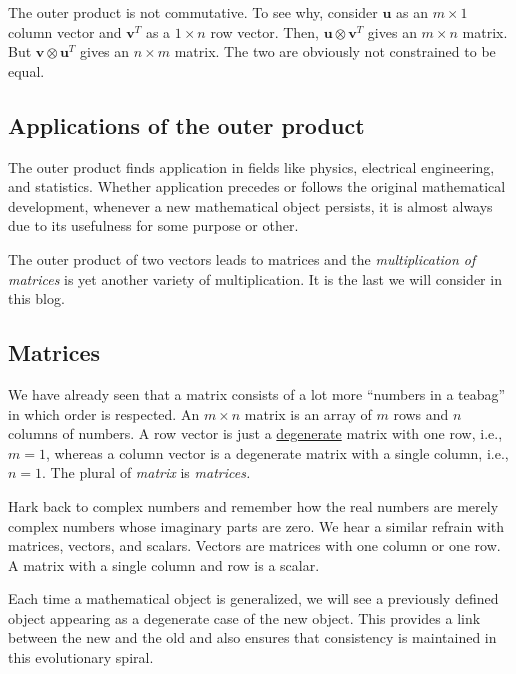 \documentclass[
  a4paper,
]{article}
\begin{document}
The outer product is not commutative. To see why, consider
\(\mathbf{u}\) as an \(m \times 1\) column vector and \(\mathbf{v}^{T}\)
as a \(1 \times n\) row vector. Then,
\(\mathbf{u} \otimes \mathbf{v}^{T}\) gives an \(m \times n\) matrix.
But \(\mathbf{v} \otimes \mathbf{u}^{T}\) gives an \(n \times m\)
matrix. The two are obviously not constrained to be equal.

\hypertarget{applications-of-the-outer-product}{%
\subsection{Applications of the outer
product}\label{applications-of-the-outer-product}}

The outer product finds application in fields like physics, electrical
engineering, and statistics. Whether application precedes or follows the
original mathematical development, whenever a new mathematical object
persists, it is almost always due to its usefulness for some purpose or
other.

The outer product of two vectors leads to matrices and the
\emph{multiplication of matrices} is yet another variety of
multiplication. It is the last we will consider in this blog.

\hypertarget{matrices}{%
\subsection{Matrices}\label{matrices}}

We have already seen that a matrix consists of a lot more ``numbers in a
teabag'' in which order is respected. An \(m \times n\) matrix is an
array of \(m\) rows and \(n\) columns of numbers. A row vector is just a
\href{https://en.wikipedia.org/wiki/Degenerate_\%28mathematics\%29}{degenerate}
matrix with one row, i.e., \(m = 1\), whereas a column vector is a
degenerate matrix with a single column, i.e., \(n = 1\). The plural of
\emph{matrix} is \emph{matrices.}

Hark back to complex numbers and remember how the real numbers are
merely complex numbers whose imaginary parts are zero. We hear a similar
refrain with matrices, vectors, and scalars. Vectors are matrices with
one column or one row. A matrix with a single column and row is a
scalar.

Each time a mathematical object is generalized, we will see a previously
defined object appearing as a degenerate case of the new object. This
provides a link between the new and the old and also ensures that
consistency is maintained in this evolutionary spiral.
\end{document}
